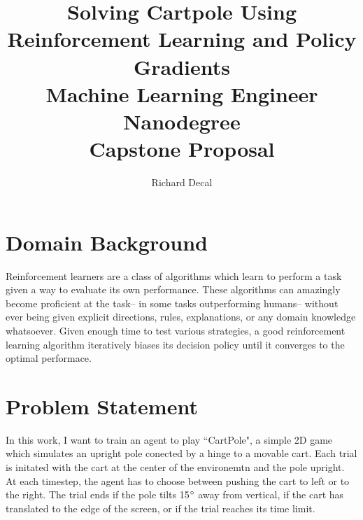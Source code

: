 \documentclass[12pt,a4paper]{article}
\author{Richard Decal}
\title{%
  Solving Cartpole Using Reinforcement Learning and Policy Gradients \\
  \large Machine Learning Engineer Nanodegree\\
  Capstone Proposal}
\begin{document}
\maketitle




\section*{Domain Background}


Reinforcement learners are a class of algorithms which learn to perform a task given a way to evaluate its own performance. These algorithms can amazingly become proficient at the task-- in some tasks outperforming humans-- without ever being given explicit directions, rules, explanations, or any domain knowledge whatsoever. Given enough time to test various strategies, a good reinforcement learning algorithm iteratively biases its decision policy until it converges to the optimal performace.


\section*{Problem Statement}
%

In this work, I want to train an agent to play ``CartPole", a simple 2D game which simulates an upright pole conected by a hinge to a movable cart.\cite{cartpole} Each trial is initated with the cart at the center of the environemtn and the pole upright. At each timestep, the agent has to choose between pushing the cart to left or to the right. The trial ends if the pole tilts 15$\degree$ away from vertical, if the cart has translated to the edge of the screen, or if the trial reaches its time limit.
\end{document}
